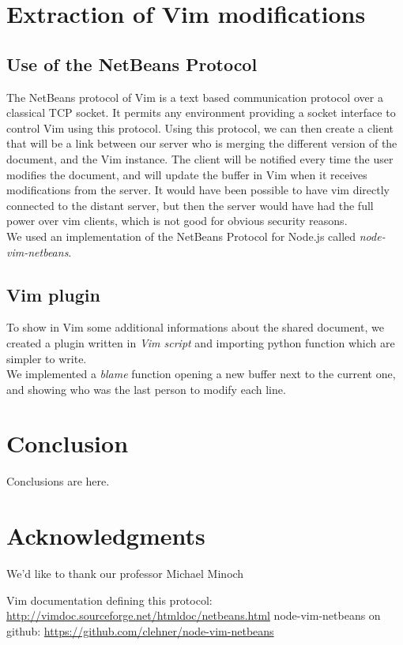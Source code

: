 \documentclass{llncs}
\begin{document}
\section{Extraction of Vim modifications}\label{sec:Others}

\subsection{Use of the NetBeans Protocol}

The NetBeans protocol of Vim is a text based communication protocol over a
classical TCP socket.
It permits any environment providing a socket interface to control Vim using
this protocol.\cite{netbeans} Using this protocol, we can then create a client
that will be a link between our server who is merging the different version of
the document, and the Vim instance.
The client will be notified every time the user modifies the document, and will
update the buffer in Vim when it receives modifications from the server.
It would have been possible to have vim directly connected to the distant
server, but then the server would have had the full power over vim clients,
which is not good for obvious security reasons.\\
We used an implementation of the NetBeans Protocol for Node.js called
\textit{node-vim-netbeans}.\cite{node-vim-netbeans}

\subsection{Vim plugin}

To show in Vim some additional informations about the shared document, we
created a plugin written in \textit{Vim script} and importing python function
which are simpler to write.\\
We implemented a \textit{blame} function opening a new buffer next to the
current one, and showing who was the last person to modify each line.

\section{Conclusion}\label{sec:Conclusion}

Conclusions are here.

\section*{Acknowledgments}\label{sec:Acknowledgments}

We'd like to thank our professor Michael Minoch

\begin{thebibliography}{1}

Vim documentation defining this protocol: \url{http://vimdoc.sourceforge.net/htmldoc/netbeans.html}
node-vim-netbeans on github: \url{https://github.com/clehner/node-vim-netbeans}

\end{thebibliography}
\end{document}
